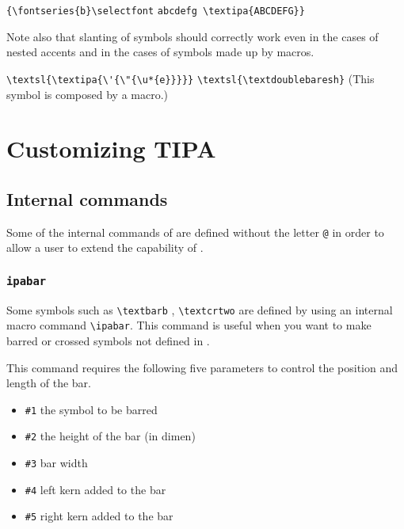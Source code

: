 \begin{tipaexample}
  \yitem \verb|{\fontseries{b}\selectfont|
    \verb|abcdefg \textipa{ABCDEFG}}|
\end{tipaexample}

Note also that slanting of \tipa{} symbols should correctly work even
in the cases of nested accents and in the cases of symbols made up
by macros.

\begin{tipaexample}
  \yitem \verb|\textsl{\textipa{\'{\"{\u*{e}}}}}|
  \yitem \textsl{}
  \yitem \verb|\textsl{\textdoublebaresh}|
  \yitem \textsl{\textdoublebaresh\/} {\small(This symbol is
    composed by a macro.)}
\end{tipaexample}


\clearemptydoublepage
\chapter{Customizing TIPA}


\section{Internal commands}

Some of the internal commands of \tipa{} are defined without the
letter \texttt{@} in order to allow a user to extend the capability of 
\tipa{}.

\subsection{{\tt\tbs ipabar}}

Some \tipa{} symbols such as \verb|\textbarb| \textbarb,
\verb|\textcrtwo| \textcrtwo{} are defined by using an internal macro
command \verb|\ipabar|. This command is useful when you want to make
barred or crossed symbols not defined in \tipa{}.

This command requires the following five parameters to control the
position and length of the bar.

\begin{itemize}
\itemsep0pt
\item {\tt\#1} the symbol to be barred
\item {\tt\#2} the height of the bar (in dimen)
\item {\tt\#3} bar width
\item {\tt\#4} left kern added to the bar
\item {\tt\#5} right kern added to the bar
\end{itemize}

